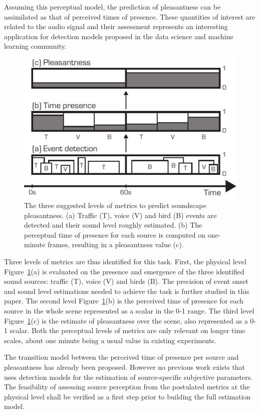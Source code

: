 \documentclass{article}
\begin{document}
\begin{sloppy}
Assuming this perceptual model, the prediction of pleasantness can be assimilated as that of perceived times of presence. These quantities of interest are related to the audio signal and their assessment represents an interesting application for detection models proposed in the data science and machine learning community.

\begin{figure}[t]
  \centering
  \centerline{\includegraphics[width=0.8\columnwidth]{block.pdf}}
  \caption{The three suggested levels of metrics to predict soundscape pleasantness. (a) Traffic (T), voice (V) and bird (B) events are detected and their sound level roughly estimated. (b) The perceptual time of presence for each source is computed on one-minute frames, resulting in a pleasantness value (c).}
  \label{fig:block}
\end{figure}

Three levels of metrics are thus identified for this task. First, the physical level Figure~\ref{fig:block}(a) is evaluated on the presence and emergence of the three identified sound sources: traffic (T), voice (V) and birds (B). The precision of event onset and sound level estimations needed to achieve the task is further studied in this paper. The second level Figure~\ref{fig:block}(b) is the perceived time of presence for each source in the whole scene represented as a scalar in the 0-1 range. The third level Figure~\ref{fig:block}(c) is the estimate of pleasantness over the scene, also represented as a 0-1 scalar. Both the perceptual levels of metrics are only relevant on longer time scales, about one minute being a usual value in existing experiments.

The transition model between the perceived time of presence per source and pleasantness has already been proposed. However no previous work exists that uses detection models for the estimation of source-specific subjective parameters. The feasibility of assessing source perception from the postulated metrics at the physical level shall be verified as a first step prior to building the full estimation model.


\end{sloppy}
\end{document}

